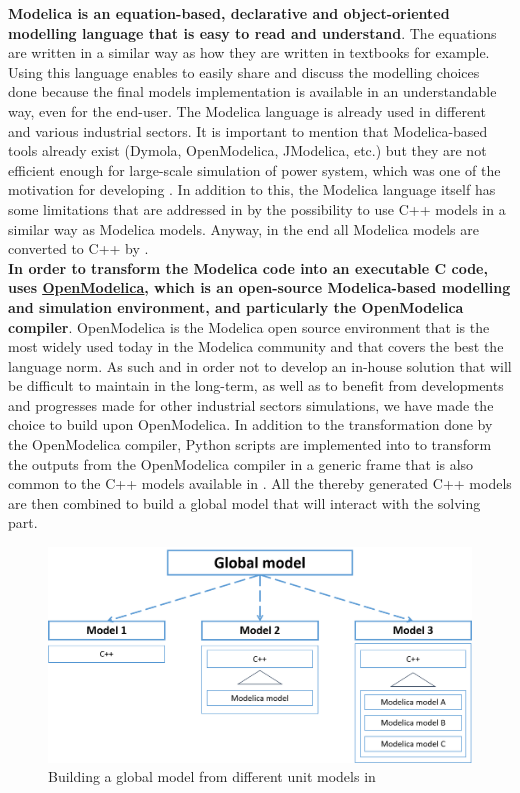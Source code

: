\documentclass[a4paper, 12pt]{report}
\begin{document}
\textbf{Modelica is an equation-based, declarative and object-oriented modelling language that is easy to read and understand}. The equations are written in a similar way as how they are written in textbooks for example. Using this language enables to easily share and discuss the modelling choices done because the final models implementation is available in an understandable way, even for the end-user. The Modelica language is already used in different and various industrial sectors. It is important to mention that Modelica-based tools already exist (Dymola, OpenModelica, JModelica, etc.) but they are not efficient enough for large-scale simulation of power system, which was one of the motivation for developing \Dynawo. In addition to this, the Modelica language itself has some limitations that are addressed in \Dynawo by the possibility to use C++ models in a similar way as Modelica models. Anyway, in the end all Modelica models are converted to C++ by \Dynawo. \\

\textbf{In order to transform the Modelica code into an executable C code, \Dynawo uses \href{https://www.openmodelica.org/}{\underline{OpenModelica}}, which is an open-source Modelica-based modelling and simulation environment, and particularly the OpenModelica compiler}. OpenModelica is the Modelica open source environment that is the most widely used today in the Modelica community and that covers the best the language norm. As such and in order not to develop an in-house solution that will be difficult to maintain in the long-term, as well as to benefit from developments and progresses made for other industrial sectors simulations, we have made the choice to build \Dynawo upon OpenModelica. In addition to the transformation done by the OpenModelica compiler, Python scripts are implemented into \Dynawo to transform the outputs from the OpenModelica compiler in a generic frame that is also common to the C++ models available in \Dynawo. All the thereby generated C++ models are then combined to build a global model that will interact with the solving part.

\begin{figure}[h!]
\centering
\includegraphics[width=\textwidth]{../resources/GlobalModel.png}
\caption{Building a global model from different unit models in \Dynawo}
\end{figure}
\end{document}
